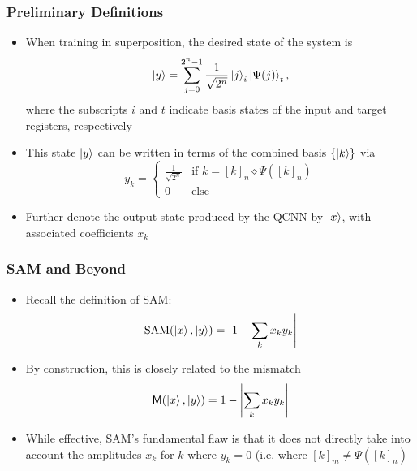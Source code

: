 \documentclass{beamer}
\begin{document}
\begin{frame}
\frametitle{Preliminary Definitions}
\begin{itemize}
\item When training in superposition, the \alert{desired state} of the system is 
\begin{equation}
\ket{y} = \sum_{j=0}^{2^n-1} \frac{1}{\sqrt{2^n}} \ket{j}_i \ket{\Psi(j)}_t,
\end{equation}
where the subscripts $i$ and $t$ indicate basis states of the input and target registers, respectively
\item This state $\ket{y}$ can be written in terms of the \alert{combined basis} $\{ \ket{k} \}$ via 
\begin{equation}
y_k = \begin{cases}
\frac{1}{\sqrt{2^n}}  & \text{if } k=[k]_n \diamond \Psi([k]_n) \\
0 & \text{else} 
\end{cases}
\end{equation}
\item Further denote the \alert{output state} produced by the QCNN by $\ket{x}$, with associated coefficients $x_k$
\end{itemize}
\end{frame}

\begin{frame}
\frametitle{SAM and Beyond}
\begin{itemize}
\item Recall the definition of \alert{SAM}:
\begin{equation}
\text{SAM}(\ket{x}, \ket{y}) = \left\vert 1 - \sum_k x_k y_k \right\vert 
\end{equation}
\item By construction, this is closely related to the \alert{mismatch} 
\begin{equation}
\mathsf{M}(\ket{x}, \ket{y}) = 1 - \left|\sum_k x_k y_k\right|
\end{equation}
\item While effective, SAM's \alert{fundamental flaw} is that it does not directly take into account the amplitudes $x_k$ for $k$ where $y_k =0$ (i.e. where $[k]_m \neq \Psi([k]_n)$
\end{itemize}
\end{frame}
\end{document}

